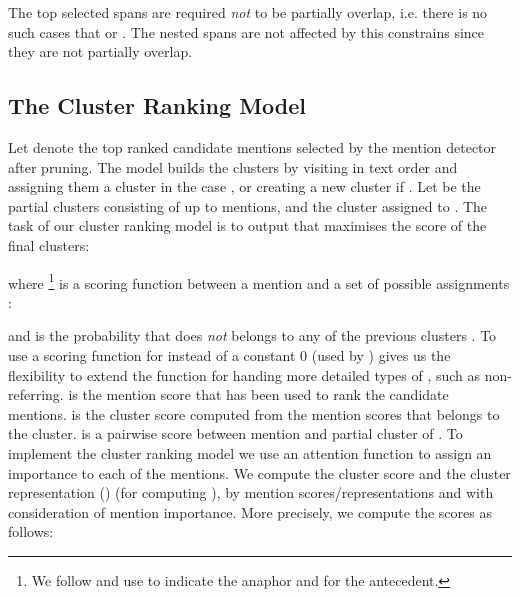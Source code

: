 \documentclass[10pt, a4paper]{article}
\begin{document}
\small

\normalsize

The top  selected spans are required \textit{not} to be partially overlap, i.e. there is no such cases that  or . The nested spans are not affected by this constrains since they are not partially overlap. 


\subsection{The Cluster Ranking Model}
Let  denote the top ranked  candidate mentions selected by the mention detector after pruning. 
The model builds the clusters  by visiting  in  text order and assigning them a cluster in the case  , or creating a new cluster if . 
Let  be the partial clusters consisting of up to  mentions, and   the cluster assigned to . 
The task of our cluster ranking model is to output  that maximises the score of the final clusters:

\small

\normalsize

where \footnote{We follow  and use  to indicate the anaphor and  for the antecedent.} is a scoring function between a mention  and a set of possible assignments :

\small

\normalsize


and  is the probability that  does \textit{not} belongs to any of the previous clusters . To use a scoring function for  instead of a constant 0 (used by ) gives us the flexibility to extend the function for handing more detailed types of , such as non-referring.      is the mention score that has been used to rank the candidate mentions.  is the cluster score computed from the mention scores that belongs to the cluster.  is a pairwise score between  mention  and  partial cluster of . 
To implement the cluster ranking model we use an attention function  \cite{bahdanau2014neural} to assign an importance to each of the mentions. 
We compute the cluster score  and the cluster representation () (for computing ), by mention scores/representations and with consideration of  mention 
importance.  More precisely, we compute the scores as follows:

\small
\vspace{-10pt}

\normalsize
\end{document}
